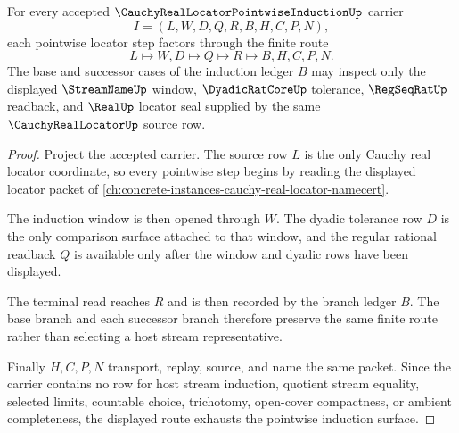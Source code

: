 \begin{theorem}
\label{thm:cauchy-real-locator-pointwise-window-induction}
For every accepted $\CauchyRealLocatorPointwiseInductionUp$ carrier
$$
I=(L,W,D,Q,R,B,H,C,P,N),
$$
each pointwise locator step factors through the finite route
$$
L \longmapsto W,D \longmapsto Q \longmapsto R \longmapsto B,H,C,P,N .
$$
The base and successor cases of the induction ledger $B$ may inspect only the
displayed $\StreamNameUp$ window, $\DyadicRatCoreUp$ tolerance,
$\RegSeqRatUp$ readback, and $\RealUp$ locator seal supplied by the same
$\CauchyRealLocatorUp$ source row.
\end{theorem}
\begin{proof}
Project the accepted carrier. The source row $L$ is the only Cauchy real
locator coordinate, so every pointwise step begins by reading the displayed
locator packet of \autoref{ch:concrete-instances-cauchy-real-locator-namecert}.

The induction window is then opened through $W$. The dyadic tolerance row $D$
is the only comparison surface attached to that window, and the regular
rational readback $Q$ is available only after the window and dyadic rows have
been displayed.

The terminal read reaches $R$ and is then recorded by the branch ledger $B$.
The base branch and each successor branch therefore preserve the same finite
route rather than selecting a host stream representative.

Finally $H,C,P,N$ transport, replay, source, and name the same packet. Since
the carrier contains no row for host stream induction, quotient stream
equality, selected limits, countable choice, trichotomy, open-cover
compactness, or ambient completeness, the displayed route exhausts the
pointwise induction surface.
\end{proof}

